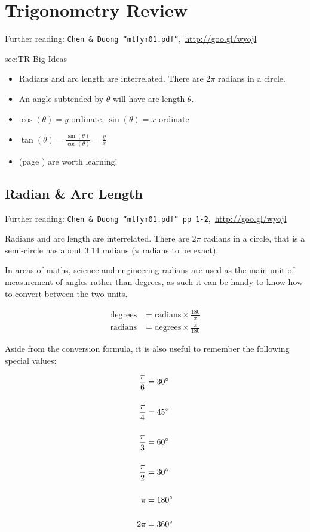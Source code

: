 \chapter{Trigonometry Review}
\label{chap:TR}
Further reading: \texttt{Chen \& Duong ``mtfym01.pdf''},\, \url{http://goo.gl/wyojl}

\begin{bigideas}{sec:TR Big Ideas}
\begin{itemize}
  \item Radians and arc length are interrelated. There are $2\pi$ radians
  in a circle.
  \item An angle subtended by $\theta$ will have arc length $\theta$.
  \item $\cos(\theta) = y$-ordinate, $\sin(\theta) = x$-ordinate
  \item $\tan(\theta) = \frac{\sin(\theta)}{\cos(\theta)} = \frac{y}{x}$
  \item {} (page \pageref{sec:TR
  Pythagorean Identities}) are worth learning!
\end{itemize}
\end{bigideas}

\section{Radian \& Arc Length}
\label{sec:TR Radian and Arc Length}
Further reading: \texttt{Chen \& Duong ``mtfym01.pdf'' pp 1-2},\, \url{http://goo.gl/wyojl}

Radians and arc length are interrelated. There are $2\pi$ radians in a circle,
that is a semi-circle has about $3.14$ radians ($\pi$ radians to be exact).

In areas of maths, science and engineering radians are used as the main unit of
measurement of angles rather than degrees, as such it can be handy to know how
to convert between the two units.

\begin{align}
  \text{degrees} & = \text{radians} \times \frac{180}{\pi} \\[0.5cm]
  \text{radians} & = \text{degrees} \times \frac{\pi}{180}
\end{align}

Aside from the conversion formula, it is also useful to remember the following
special values:

\begin{align}
  \frac{\pi}{6} & = 30^\circ \\[0.5cm]
  \frac{\pi}{4} & = 45^\circ \\[0.5cm]
  \frac{\pi}{3} & = 60^\circ \\[0.5cm]
  \frac{\pi}{2} & = 30^\circ \\[0.5cm]
  \pi           & = 180^\circ \\[0.5cm]
  2\pi &= 360^\circ
\end{align}

